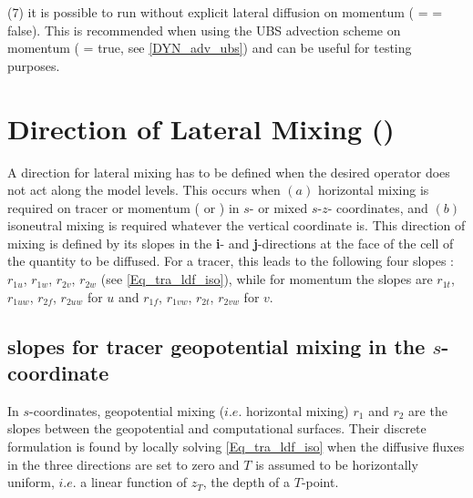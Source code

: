 \documentclass[NEMO_book]{subfiles}
\begin{document}
(7) it is possible to run without explicit lateral diffusion on momentum ( = 
 = false). This is recommended when using the UBS advection 
scheme on momentum ( = true, see \ref{DYN_adv_ubs}) 
and can be useful for testing purposes.

\section  [Direction of Lateral Mixing (\textit{ldfslp})]
		{Direction of Lateral Mixing ()}
\label{LDF_slp}


A direction for lateral mixing has to be defined when the desired operator does 
not act along the model levels. This occurs when $(a)$ horizontal mixing is 
required on tracer or momentum ( or ) 
in $s$- or mixed $s$-$z$- coordinates, and $(b)$ isoneutral mixing is required 
whatever the vertical coordinate is. This direction of mixing is defined by its 
slopes in the \textbf{i}- and \textbf{j}-directions at the face of the cell of the 
quantity to be diffused. For a tracer, this leads to the following four slopes : 
$r_{1u}$, $r_{1w}$, $r_{2v}$, $r_{2w}$ (see \eqref{Eq_tra_ldf_iso}), while 
for momentum the slopes are  $r_{1t}$, $r_{1uw}$, $r_{2f}$, $r_{2uw}$ for 
$u$ and  $r_{1f}$, $r_{1vw}$, $r_{2t}$, $r_{2vw}$ for $v$. 


\subsection{slopes for tracer geopotential mixing in the $s$-coordinate}

In $s$-coordinates, geopotential mixing ($i.e.$ horizontal mixing) $r_1$ and 
$r_2$ are the slopes between the geopotential and computational surfaces. 
Their discrete formulation is found by locally solving \eqref{Eq_tra_ldf_iso} 
when the diffusive fluxes in the three directions are set to zero and $T$ is 
assumed to be horizontally uniform, $i.e.$ a linear function of $z_T$, the 
depth of a $T$-point. 
\end{document}
